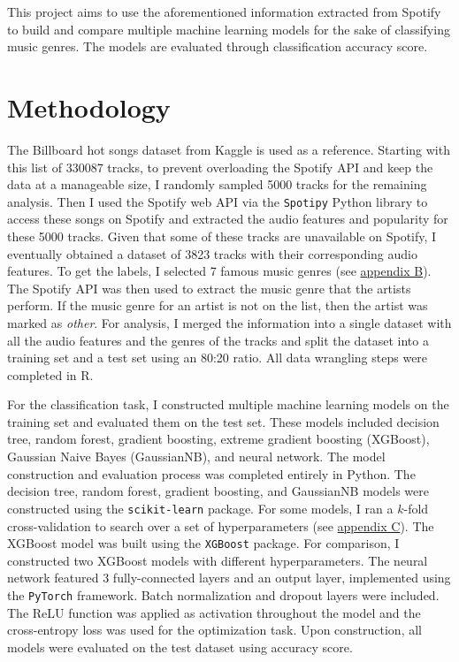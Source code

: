 \documentclass{article}
\begin{document}
This project aims to use the aforementioned information extracted from Spotify to build and compare multiple machine learning models for the sake of classifying music genres. The models are evaluated through classification accuracy score.

\section{Methodology}

The Billboard hot songs dataset from Kaggle is used as a reference. Starting with this list of 330087 tracks, to prevent overloading the Spotify API and keep the data at a manageable size, I randomly sampled 5000 tracks for the remaining analysis. Then I used the Spotify web API via the \texttt{Spotipy} Python library to access these songs on Spotify and extracted the audio features and popularity for these 5000 tracks. Given that some of these tracks are unavailable on Spotify, I eventually obtained a dataset of 3823 tracks with their corresponding audio features. To get the labels, I selected 7 famous music genres (see \hyperref[sec:select_music_genres]{appendix B}). The Spotify API was then used to extract the music genre that the artists perform. If the music genre for an artist is not on the list, then the artist was marked as \textit{other}. For analysis, I merged the information into a single dataset with all the audio features and the genres of the tracks and split the dataset into a training set and a test set using an 80:20 ratio. All data wrangling steps were completed in R.

For the classification task, I constructed multiple machine learning models on the training set and evaluated them on the test set. These models included decision tree, random forest, gradient boosting, extreme gradient boosting (XGBoost), Gaussian Naive Bayes (GaussianNB), and neural network. The model construction and evaluation process was completed entirely in Python. The decision tree, random forest, gradient boosting, and GaussianNB models were constructed using the \texttt{scikit-learn} package. For some models, I ran a \(k\)-fold cross-validation to search over a set of hyperparameters (see \hyperref[sec:hyperparameters]{appendix C}). The XGBoost model was built using the \texttt{XGBoost} package. For comparison, I constructed two XGBoost models with different hyperparameters. The neural network featured 3 fully-connected layers and an output layer, implemented using the \texttt{PyTorch} framework. Batch normalization and dropout layers were included. The ReLU function was applied as activation throughout the model and the cross-entropy loss was used for the optimization task. Upon construction, all models were evaluated on the test dataset using accuracy score.
\end{document}
